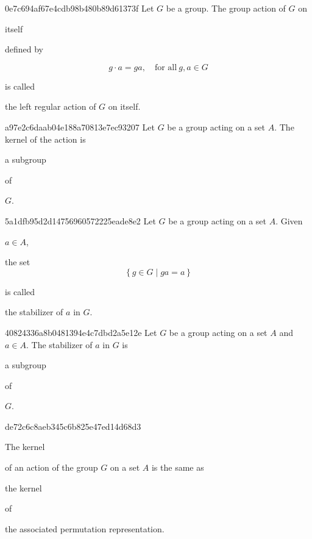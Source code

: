 \begin{note}{0e7c694af67e4cdb98b480b89d61373f}
    Let \({ G }\) be a group.
    The group action of \({ G }\) on \begin{icloze}{3}itself\end{icloze} defined by
    \begin{icloze}{1}
        \[
            g \cdot a = ga, \quad \text{for all}\ g, a \in G
        \]
    \end{icloze}
    is called \begin{icloze}{2}the left regular action of \({ G }\) on itself.\end{icloze}
\end{note}

\begin{note}{a97e2c6daab04e188a70813e7ec93207}
    Let \({ G }\) be a group acting on a set \({ A }\).
    The kernel of the action is \begin{icloze}{2}a subgroup\end{icloze} of \begin{icloze}{1}\({ G }\).\end{icloze}
\end{note}

\begin{note}{5a1dfb95d2d14756960572225eade8e2}
    Let \({ G }\) be a group acting on a set \({ A }\).
    Given \begin{icloze}{3}\({ a \in A }\),\end{icloze}
    \begin{icloze}{1}
        the set
        \[
            \left\{ g \in G \mid ga = a \right\}
        \]
    \end{icloze}
    is called \begin{icloze}{2}the stabilizer of \({ a }\) in \({ G }\).\end{icloze}
\end{note}

\begin{note}{40824336a8b0481394e4c7dbd2a5e12e}
    Let \({ G }\) be a group acting on a set \({ A }\) and \({ a \in A }\).
    The stabilizer of \({ a }\) in \({ G }\) is \begin{icloze}{2}a subgroup\end{icloze} of \begin{icloze}{1}\({ G }\).\end{icloze}
\end{note}

\begin{note}{de72c6c8aeb345c6b825e47ed14d68d3}
    \begin{icloze}{2}The kernel\end{icloze} of an action of the group \({ G }\) on a set \({ A }\) is the same as \begin{icloze}{3}the kernel\end{icloze} of \begin{icloze}{1}the associated permutation representation.\end{icloze}
\end{note}

